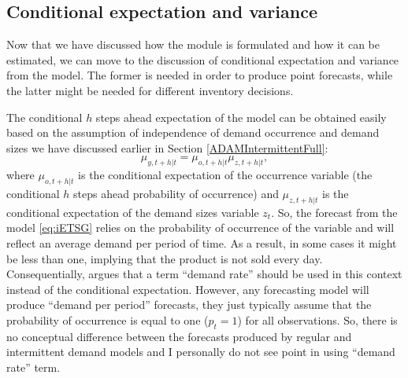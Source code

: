 \documentclass[
]{book}
\theoremstyle{definition}
\theoremstyle{definition}
\theoremstyle{definition}
\theoremstyle{definition}
\theoremstyle{remark}
\begin{document}
\hypertarget{conditional-expectation-and-variance}{%
\subsection{Conditional expectation and variance}\label{conditional-expectation-and-variance}}

Now that we have discussed how the module is formulated and how it can be estimated, we can move to the discussion of conditional expectation and variance from the model. The former is needed in order to produce point forecasts, while the latter might be needed for different inventory decisions.

The conditional \(h\) steps ahead expectation of the model can be obtained easily based on the assumption of independence of demand occurrence and demand sizes we have discussed earlier in Section \ref{ADAMIntermittentFull}:
\begin{equation}
    \mu_{y,t+h|t} = \mu_{o,t+h|t} \mu_{z,t+h|t},
    \label{eq:iETSConditionalExpectation}
\end{equation}
where \(\mu_{o,t+h|t}\) is the conditional expectation of the occurrence variable (the conditional \(h\) steps ahead probability of occurrence) and \(\mu_{z,t+h|t}\) is the conditional expectation of the demand sizes variable \(z_t\). So, the forecast from the model \eqref{eq:iETSG} relies on the probability of occurrence of the variable and will reflect an average demand per period of time. As a result, in some cases it might be less than one, implying that the product is not sold every day. Consequentially, \citet{Kourentzes2014a} argues that a term ``demand rate'' should be used in this context instead of the conditional expectation. However, any forecasting model will produce ``demand per period'' forecasts, they just typically assume that the probability of occurrence is equal to one (\(p_t=1\)) for all observations. So, there is no conceptual difference between the forecasts produced by regular and intermittent demand models and I personally do not see point in using ``demand rate'' term.
\end{document}

